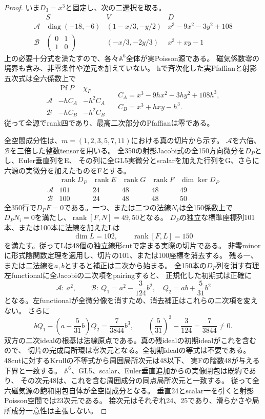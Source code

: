 \documentclass[a4paper,11pt]{ltjsarticle}
\theoremstyle{definition}
\begin{document}
\begin{proof}
いま$D_3=x^3$と固定し、次の二選択を取る。
\[
\begin{array}{c|c|c|c}
 &S&V&D\\\hline
 \mathcal A&\operatorname{diag}(-18,-6)&(1-x/3,-y/2)&
 x^3-9x^2-3y^2+108\\
 \mathcal B&\begin{pmatrix}0&1\\1&0\end{pmatrix}&(-x/3,-2y/3)&
 x^3+xy-1
\end{array}
\]
上の必要十分式を満たすので、各々$\mathbb A^6$全体が実Poisson源である。
磁気係数零の境界も含み、非零条件や逆元を加えていない。
hで斉次化した実Pfaffianと射影五次式は全六係数上で
\[
 \begin{array}{c|c|c}
 &\operatorname{Pf}P&\chi_P\\\hline
 \mathcal A&-hC_A&-h^2C_A\\
 \mathcal B&-hC_B&-h^2C_B
 \end{array}
 \quad
 \begin{gathered}
 C_A=x^3-9hx^2-3hy^2+108h^3,\\
 C_B=x^3+hxy-h^3.
 \end{gathered}
\]
従って全源でrank四であり、最高二次部分のPfaffianは零である。

全空間成分性は、$m=(1,2,3,5,7,11)$における真の切片から示す。
$\mathcal A$を六倍、$\mathcal B$を三倍した整数tensorを用いる。
全350の射影Jacobi式の全150方向微分を$D_P$とし、Euler垂直列をE、
その列に全GL5実微分とscalarを加えた行列をG、さらに六源の実微分を加えたものをFとする。
\[
\begin{array}{c|rrrrr}
 &\operatorname{rank}D_P&\operatorname{rank}E&\operatorname{rank}G&
 \operatorname{rank}F&\dim\ker D_P\\\hline
 \mathcal A&101&24&48&48&49\\
 \mathcal B&100&24&48&48&50
\end{array}
\]
全350行で$D_PF=0$である。一つ、または二つの法線$N_i$は全150係数上で
$D_PN_i=0$を満たし、$\operatorname{rank}[F,N]=49,50$となる。
$D_P$の独立な標準座標列101本、または100本に法線を加えたLは
\[
 \dim L=102,\qquad\operatorname{rank}[F,L]=150
\]
を満たす。従ってLは48個の独立線形cutで定まる実際の切片である。
非零minorに形式陰関数定理を適用し、切片の101、または100座標を消去する。
残る一、または二法線を$a,b$とすると補正は二次から始まる。
全150本の$D_P$列を消す有理左functionalに全Jacobiの二次項をpairingすると、
正規化した初期式は正確に
\[
 \mathcal A:\ a^2,\qquad
 \mathcal B:\ Q_1=a^2-\frac3{124}b^2,\quad
 Q_2=ab+\frac5{31}b^2
\]
となる。左functionalが全微分像を消すため、消去補正はこれらの二次項を変えない。
さらに
\[
 bQ_1-\left(a-\frac5{31}b\right)Q_2=\frac7{3844}b^3,
 \qquad \left(\frac5{31}\right)^2-\frac3{124}=\frac7{3844}\ne0.
\]
双方の二次idealの根基は法線原点である。真の残idealの初期idealがこれを含むので、
切片の完成局所環は零次元となる。全初期idealの等式は不要である。
48cutに対するKrullの不等式から周囲局所次元は48以下、
実Fの階数48が与える下界と一致する。
$\mathbb A^6$、GL5、scalar、Euler垂直追加からの実像閉包は既約であり、
その次元48は、これを含む周囲成分の同点局所次元と一致する。
従って全六磁気源の飽和閉包自体が全空間成分となる。
垂直24とscalar一を引くと射影Poisson空間では23次元である。
接次元はそれぞれ24、25であり、滑らかさや局所成分一意性は主張しない。


\end{proof}
\end{document}
